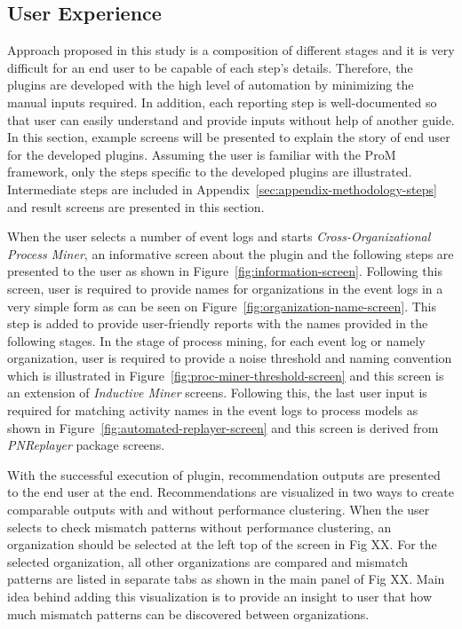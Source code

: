 \subsection{User Experience}
\label{subsec:architecture}
Approach proposed in this study is a composition of different stages and it is very difficult for an end user to be capable of each step's details. Therefore, the plugins are developed with the high level of automation by minimizing the manual inputs required. In addition, each reporting step is well-documented so that user can easily understand and provide inputs without help of another guide. In this section, example screens will be presented to explain the story of end user for the developed plugins. Assuming the user is familiar with the ProM framework, only the steps specific to the developed plugins are illustrated. Intermediate steps are included in Appendix~\ref{sec:appendix-methodology-steps} and result screens are presented in this section.

When the user selects a number of event logs and starts \textit{Cross-Organizational Process Miner}, an informative screen about the plugin and the following steps are presented to the user as shown in Figure~\ref{fig:information-screen}. Following this screen, user is required to provide names for organizations in the event logs in a very simple form as can be seen on Figure~\ref{fig:organization-name-screen}. This step is added to provide user-friendly reports with the names provided in the following stages. In the stage of process mining, for each event log or namely organization, user is required to provide a noise threshold and naming convention which is illustrated in Figure~\ref{fig:proc-miner-threshold-screen} and this screen is an extension of \textit{Inductive Miner} \cite{leemans2014discoveringinfrequent} screens. Following this, the last user input is required for matching activity names in the event logs to process models as shown in Figure~\ref{fig:automated-replayer-screen} and this screen is derived from \textit{PNReplayer} package \cite{adriansyah2011towards} screens.

With the successful execution of plugin, recommendation outputs are presented to the end user at the end. Recommendations are visualized in two ways to create comparable outputs with and without performance clustering. When the user selects to check mismatch patterns without performance clustering, an organization should be selected at the left top of the screen in Fig XX. For the selected organization, all other organizations are compared and mismatch patterns are listed in separate tabs as shown in the main panel of Fig XX. Main idea behind adding this visualization is to provide an insight to user that how much mismatch patterns can be discovered between organizations.

